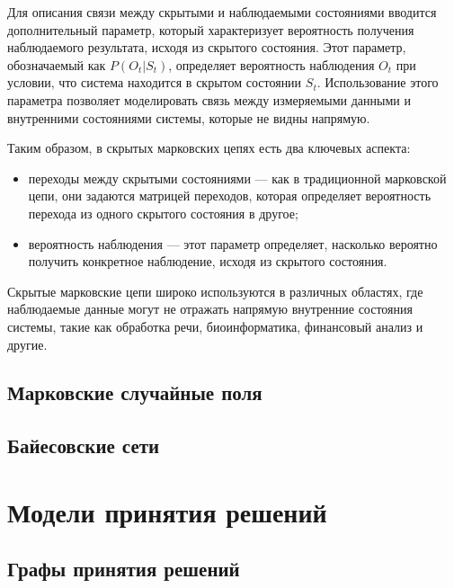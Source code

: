 Для описания связи между скрытыми и наблюдаемыми состояниями вводится дополнительный параметр, который характеризует вероятность получения наблюдаемого результата, исходя из скрытого состояния. Этот параметр, обозначаемый как $P(O_t | S_t)$, определяет вероятность наблюдения $O_t$ при условии, что система находится в скрытом состоянии $S_t$. Использование этого параметра позволяет моделировать связь между измеряемыми данными и внутренними состояниями системы, которые не видны напрямую.

Таким образом, в скрытых марковских цепях есть два ключевых аспекта:

\begin{itemize}
	\item переходы между скрытыми состояниями — как в традиционной марковской цепи, они задаются матрицей переходов, которая определяет вероятность перехода из одного скрытого состояния в другое;
	\item вероятность наблюдения — этот параметр определяет, насколько вероятно получить конкретное наблюдение, исходя из скрытого состояния.
\end{itemize}

Скрытые марковские цепи широко используются в различных областях, где наблюдаемые данные могут не отражать напрямую внутренние состояния системы, такие как обработка речи, биоинформатика, финансовый анализ и другие.




\subsection{Марковские случайные поля}






\subsection{Байесовские сети}




\section{Модели принятия решений}



\subsection{Графы принятия решений}





